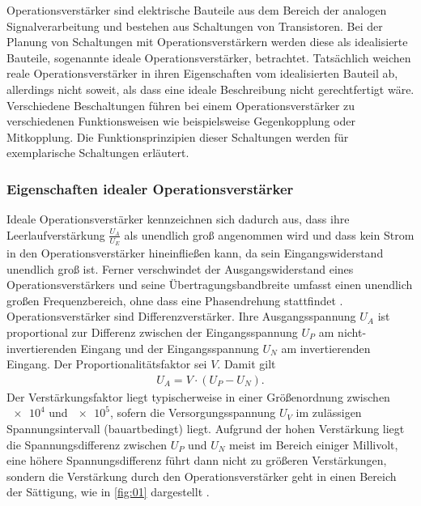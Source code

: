 Operationsverstärker sind elektrische Bauteile aus dem Bereich der analogen
Signalverarbeitung und bestehen aus Schaltungen von Transistoren. Bei der
Planung von Schaltungen mit Operationsverstärkern werden diese als idealisierte
Bauteile, sogenannte ideale Operationsverstärker, betrachtet. Tatsächlich
weichen reale Operationsverstärker in ihren Eigenschaften vom idealisierten
Bauteil ab, allerdings nicht soweit, als dass eine ideale Beschreibung nicht
gerechtfertigt wäre. \\
\noindent Verschiedene Beschaltungen führen bei einem Operationsverstärker zu
verschiedenen Funktionsweisen wie beispielsweise Gegenkopplung oder
Mitkopplung. Die Funktionsprinzipien dieser Schaltungen werden für exemplarische
Schaltungen erläutert.
\subsubsection{Eigenschaften idealer Operationsverstärker}
Ideale Operationsverstärker kennzeichnen sich dadurch aus, dass ihre
Leerlaufverstärkung $\frac{U_A}{U_E}$ als unendlich groß angenommen wird und
dass kein Strom in den Operationsverstärker hineinfließen kann, da sein
Eingangswiderstand unendlich groß ist. Ferner verschwindet der
Ausgangswiderstand eines Operationsverstärkers und seine Übertragungsbandbreite
umfasst einen unendlich großen Frequenzbereich, ohne dass eine Phasendrehung
stattfindet \cite{federau}. \\
\noindent Operationsverstärker sind Differenzverstärker. Ihre Ausgangsspannung $U_A$
ist proportional zur Differenz zwischen der Eingangsspannung $U_P$ am
nicht-invertierenden Eingang und der Eingangsspannung $U_N$ am
invertierenden Eingang. Der Proportionalitätsfaktor sei $V$. Damit gilt
\begin{align}
  U_A = V \cdot \left(U_P - U_N \right).
  \label{eqn:01}
\end{align}
\noindent Der Verstärkungsfaktor liegt typischerweise in einer Größenordnung
zwischen $\num{e4}$ und $\num{e5}$, sofern die Versorgungsspannung $U_V$ im
zulässigen Spannungsintervall (bauartbedingt) liegt. Aufgrund der hohen
Verstärkung liegt die Spannungsdifferenz zwischen $U_P$ und $U_N$ meist im
Bereich einiger Millivolt, eine höhere Spannungsdifferenz führt dann nicht
zu größeren Verstärkungen, sondern die Verstärkung durch den Operationsverstärker
geht in einen Bereich der Sättigung, wie in \autoref{fig:01} dargestellt \cite{hs-fulda}.
